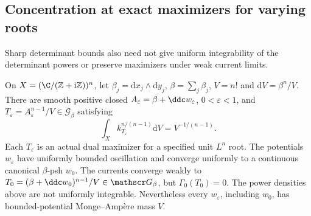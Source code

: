 \subsection{Concentration at exact maximizers for varying roots}
Sharp determinant bounds also need not give uniform integrability of
the determinant powers or preserve maximizers under weak current limits.
\begin{theorem}\label{thm:sharp-determinant-power-concentration}
On $X=(\C/(\mathbb Z+\mathrm i\mathbb Z))^n$, let $\beta_j=\mathrm dx_j\wedge\mathrm dy_j$, $\beta=\sum_j\beta_j$, $V=n!$ and $\mathrm dV=\beta^n/V$. There are smooth
positive closed $A_\varepsilon=\beta+\ddc w_\varepsilon$,
$0<\varepsilon<1$, and $T_\varepsilon=A_\varepsilon^{n-1}/V
\in\mathscr G_\beta$ satisfying
\[
 \int_X k_{T_\varepsilon}^{n/(n-1)}\mathrm dV=V^{-1/(n-1)}.
\]
Each $T_\varepsilon$ is an actual dual maximizer for a specified
unit $L^n$ root. The potentials $w_\varepsilon$ have uniformly
bounded oscillation and converge uniformly to a continuous canonical
$\beta$-psh $w_0$. The currents converge weakly to
$T_0=(\beta+\ddc w_0)^{n-1}/V\in\mathscr G_\beta$, but
$\Gamma_0(T_0)=0$. The power densities above are not uniformly
integrable. Nevertheless every $w_\varepsilon$, including $w_0$,
has bounded-potential Monge--Amp\`ere mass $V$.
\end{theorem}
